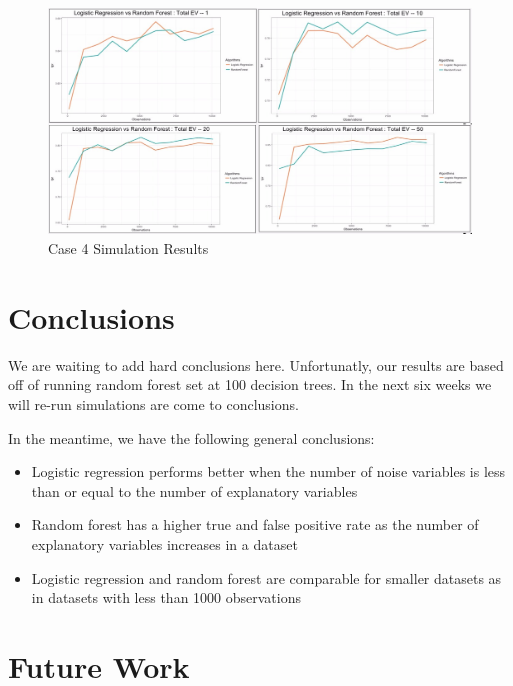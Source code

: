\documentclass{llncs}
\begin{document}
\begin{figure}
\centering
\includegraphics[scale=0.55]{case4_tpr.png}
\caption{Case 4 Simulation Results}
\label{fig:case4_tpr_results}
\end{figure}

\section{Conclusions}

We are waiting to add hard conclusions here.  Unfortunatly, our results are based off of running random forest set at 100 decision trees.  In the next six weeks we will re-run simulations are come to conclusions.

In the meantime, we have the following general conclusions:
\begin{itemize}
  \item Logistic regression performs better when the number of noise variables is less than or equal to the number of explanatory variables
  \item Random forest has a higher true and false positive rate as the number of explanatory variables increases in a dataset
  \item Logistic regression and random forest are comparable for smaller datasets as in datasets with less than 1000 observations

\end{itemize}

\section{Future Work}
\end{document}
